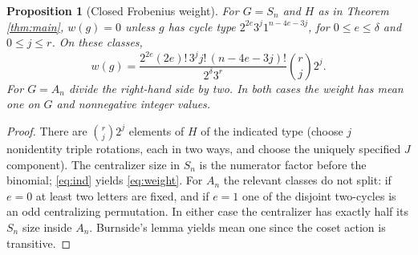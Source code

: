 \documentclass[11pt]{article}
\newtheorem{proposition}[theorem]{Proposition}
\theoremstyle{remark}\newtheorem{remark}[theorem]{Remark}
\begin{document}
\begin{proposition}[Closed Frobenius weight]\label{prop:weight}
For $G=S_n$ and $H$ as in Theorem \ref{thm:main}, $w(g)=0$ unless $g$ has
cycle type $2^{2e}3^j1^{n-4e-3j}$, for $0\le e\le\delta$ and $0\le j\le r$.
On these classes,
\begin{equation}\label{eq:weight}
 w(g)=\frac{2^{2e}(2e)!\,3^j j!\,(n-4e-3j)!}{2^\delta3^r}
              \binom{r}{j}2^j.
\end{equation}
For $G=A_n$ divide the right-hand side by two. In both cases the weight has
mean one on $G$ and nonnegative integer values.
\end{proposition}
\begin{proof}
There are $\binom{r}{j}2^j$ elements of $H$ of the indicated type (choose
$j$ nonidentity triple rotations, each in two ways, and choose the uniquely
specified $J$ component). The centralizer size in $S_n$ is the numerator
factor before the binomial; \eqref{eq:ind} yields \eqref{eq:weight}. For
$A_n$ the relevant classes do not split: if $e=0$ at least two letters are fixed,
and if $e=1$ one of the disjoint two-cycles is an odd centralizing permutation.
In either case the centralizer has exactly half its $S_n$ size inside $A_n$.
Burnside's lemma yields mean one since the coset action is transitive.
\end{proof}
\end{document}
